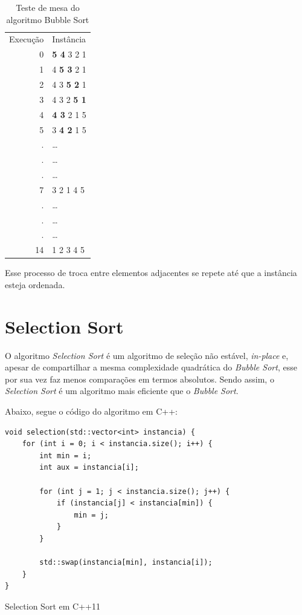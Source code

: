 \documentclass[a4paper, 12pt]{report}
\begin{document}
\begin{table}[!ht]
\caption{Teste de mesa do algoritmo Bubble Sort}
\centering
\begin{tabular}{rl}
Execução & Instância\\
0 & \textbf{5 4} 3 2 1\\
1 & 4 \textbf{5 3} 2 1\\
2 & 4 3 \textbf{5 2} 1\\
3 & 4 3 2 \textbf{5 1}\\
4 & \textbf{4 3} 2 1 5\\
5 & 3 \textbf{4 2} 1 5\\
. & \ldots{}\\
. & \ldots{}\\
. & \ldots{}\\
7 & 3 2 1 4 5\\
. & \ldots{}\\
. & \ldots{}\\
. & \ldots{}\\
14 & 1 2 3 4 5\\
\end{tabular}
\end{table}

Esse processo de troca entre elementos adjacentes se repete até que a instância
esteja ordenada.

\section{Selection Sort}
\label{sec-2-1-2}
O algoritmo \emph{Selection Sort} é um algoritmo de seleção não estável, \emph{in-place}
e, apesar de compartilhar a mesma complexidade quadrática do \emph{Bubble Sort},
esse por sua vez faz menos comparações em termos absolutos. Sendo assim, o
\emph{Selection Sort} é um algoritmo mais eficiente que o \emph{Bubble Sort}.

Abaixo, segue o código do algoritmo em C++:

\begin{listing}[H]
\begin{verbatim}
void selection(std::vector<int> instancia) {
    for (int i = 0; i < instancia.size(); i++) {
        int min = i;
        int aux = instancia[i];

        for (int j = 1; j < instancia.size(); j++) {
            if (instancia[j] < instancia[min]) {
                min = j;
            }
        }

        std::swap(instancia[min], instancia[i]);
    }
}
\end{verbatim}
\caption{Selection Sort em C++11}
\end{listing}
\end{document}
